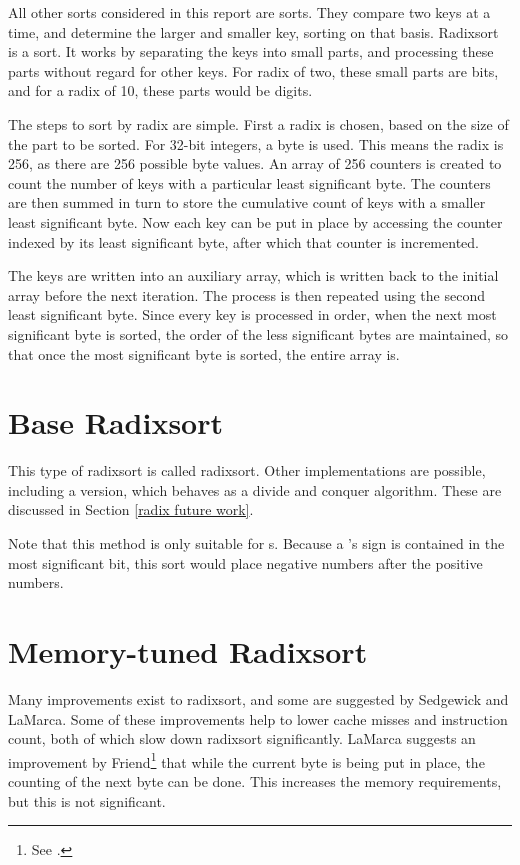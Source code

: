 \label{radix}

All other sorts considered in this report are  sorts.
They compare two keys at a time, and determine the larger and smaller key,
sorting on that basis. Radixsort is a  sort. It works by
separating the keys into small parts, and processing these parts without
regard for other keys. For radix of two, these small parts are bits, and for a
radix of 10, these parts would be digits. 

The steps to sort by radix are simple. First a radix is chosen, based on the
size of the part to be sorted. For 32-bit integers, a byte is used. This means
the radix is 256, as there are 256 possible byte values. An array of 256
counters is created to count the number of keys with a particular least
significant byte. The counters are then summed in turn to store the cumulative
count of keys with a smaller least significant byte. Now each key can be put in
place by accessing the counter indexed by its least significant byte, after
which that counter is incremented.

The keys are written into an auxiliary array, which is written back to the initial
array before the next iteration. The process is then repeated using the second
least significant byte. Since every key is processed in order, when the next
most significant byte is sorted, the order of the less significant bytes are
maintained, so that once the most significant byte is sorted, the entire array
is.

\section{Base Radixsort}

This type of radixsort is called  radixsort.
Other implementations are possible, including a 
version, which behaves as a divide and conquer algorithm. These are discussed
in Section \ref{radix future work}.

Note that this method is only suitable for s. Because a
's sign is contained in the most significant bit, this sort would
place negative numbers after the positive numbers.

\section{Memory-tuned Radixsort}
Many improvements exist to radixsort, and some are suggested by Sedgewick and
LaMarca. Some of these improvements help to lower cache misses and instruction
count, both of which slow down radixsort significantly. LaMarca suggests an
improvement by Friend\footnote{See \cite{Friend56:152}.} that while the current
byte is being put in place, the counting of the next byte can be done. This
increases the memory requirements, but this is not significant.

